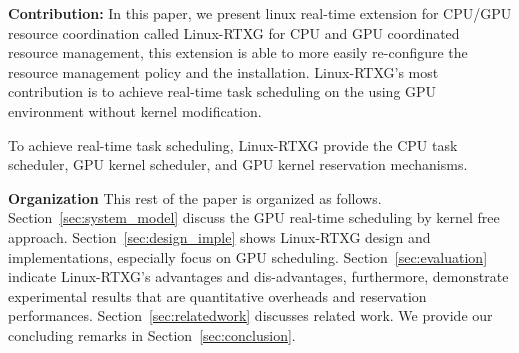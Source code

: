 \textbf{Contribution:}
In this paper, we present linux real-time extension for CPU/GPU resource coordination called Linux-RTXG for CPU and GPU coordinated resource management, this extension is able to more easily re-configure the resource management policy and the installation.
Linux-RTXG's most contribution is to achieve real-time task scheduling on the using GPU environment without kernel modification.

To achieve real-time task scheduling, 
Linux-RTXG provide the CPU task scheduler, GPU kernel scheduler, and GPU kernel reservation mechanisms.

\textbf{Organization}
This rest of the paper is organized as follows.
Section~\ref{sec:system_model} discuss the GPU real-time scheduling by kernel free approach.
Section~\ref{sec:design_imple} shows Linux-RTXG design and implementations, especially focus on GPU scheduling.
Section~\ref{sec:evaluation} indicate Linux-RTXG's advantages and dis-advantages,
furthermore, demonstrate experimental results that are quantitative overheads and reservation performances.
Section~\ref{sec:relatedwork} discusses related work.
We provide our concluding remarks in Section~\ref{sec:conclusion}.
